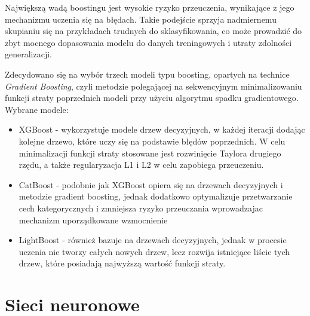\documentclass[a4paper,twoside,12pt]{book}
\begin{document}
\begin{itemize}
\begin{figure}[!h]
	      \end{figure}

	      Największą wadą boostingu jest wysokie ryzyko przeuczenia, wynikające z jego mechanizmu uczenia się na błędach. Takie podejście sprzyja nadmiernemu skupianiu się na przykładach trudnych do sklasyfikowania, co może prowadzić do zbyt mocnego dopasowania modelu do danych treningowych i utraty zdolności generalizacji.

	      Zdecydowano się na wybór trzech modeli typu boosting, opartych na technice \textit{Gradient Boosting}, czyli metodzie polegającej na sekwencyjnym minimalizowaniu funkcji straty poprzednich modeli przy użyciu algorytmu spadku gradientowego. Wybrane modele:
	      \begin{itemize}
		      \item XGBoost - wykorzystuje modele drzew decyzyjnych, w każdej iteracji dodając kolejne drzewo, które uczy się na podstawie błędów poprzednich. W celu minimalizacji funkcji straty stosowane jest rozwinięcie Taylora drugiego rzędu, a także regularyzacja L1 i L2 w celu zapobiega przeuczeniu.

		      \item CatBoost - podobnie jak XGBoost opiera się na drzewach decyzyjnych i metodzie gradient boosting, jednak dodatkowo optymalizuje przetwarzanie cech kategorycznych i zmniejsza ryzyko przeuczania wprowadzajac mechanizm uporządkowane wzmocnienie

		      \item LightBoost - również bazuje na drzewach decyzyjnych, jednak w procesie uczenia nie tworzy całych nowych drzew, lecz rozwija istniejące liście tych drzew, które posiadają najwyższą wartość funkcji straty.

	      \end{itemize}
\end{itemize}
\section{Sieci neuronowe}
\end{document}
